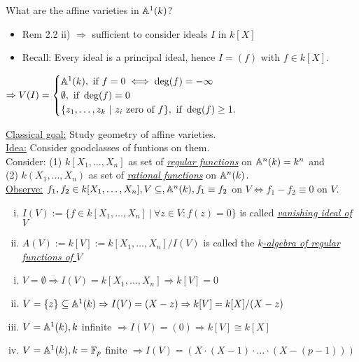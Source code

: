 \begin{Bsp}
What are the affine varieties in $\mathbb{A}^1(k)$?
\begin{itemize}
\item Rem 2.2 ii) $\Rightarrow$ sufficient to consider ideals $I$ in $k[X]$
\item Recall: Every ideal is a principal ideal, hence $I=(f)$ with $f \in k[X]$.
\end{itemize}
$\Rightarrow V(I)=\begin{cases}
\mathbb{A}^1(k), \text{ if } f = 0 \iff \deg(f)=-\infty\\
\emptyset, \text{ if } \deg(f)=0\\
\{z_1, \dots, z_k \ | \ z_i \text{ zero of } f\}, \text{ if } \deg(f) \geq 1.
\end{cases}$
\end{Bsp}

\underline{Classical goal:} Study geometry of affine varieties.\\
\underline{Idea:} Consider \glqq good\grqq classes of funtions on them.\\
Consider: (1) $k[X_1, \dots, X_n]$ as set of \emph{\underline{regular functions}} on $\mathbb{A}^n(k)=k^n$ and\\
\vphantom{Consider: } (2) $k(X_1, \dots, X_n)$ as set of \emph{\underline{rational functions}} on $\mathbb{A}^n(k)$.\\
\underline{Observe:} $f_1, f_2 \in k[X_1, \dots, X_n], V \subseteq,  \mathbb{A}^n(k), f_1 \equiv f_2$ on $V \iff f_1-f_2 \equiv 0$ on $V$.

\begin{defi}
\begin{enumerate}[i)]
\item $I(V):=\{f \in k[X_1, \dots, X_n] \ | \ \forall z \in V: f(z)=0\}$ is called \emph{\underline{vanishing ideal of $V$}}
\item $A(V):=k[V]:=k[X_1, \dots, X_n]/I(V)$ is called the \emph{\underline{$k$-algebra of regular functions of $V$}}
\end{enumerate}
\end{defi}

\begin{Bsp}
\begin{enumerate}[i)]
\item $V=\emptyset \Rightarrow I(V) = k[X_1, \dots, X_n] \Rightarrow k[V]=0$
\item $V=\{z\} \subseteq \mathbb{A}^1(k) \Rightarrow I(V)=(X-z) \Rightarrow k[V]=k[X]/(X-z)$
\item $V=\mathbb{A}^1(k), k $ infinite $\Rightarrow I(V)=(0) \Rightarrow k[V]\cong k[X]$
\item $V=\mathbb{A}^1(k), k =\mathbb{F}_p$ finite $\Rightarrow I(V)=(X\cdot(X-1)\cdot \ldots \cdot (X-(p-1)))$
\end{enumerate}
\end{Bsp}

